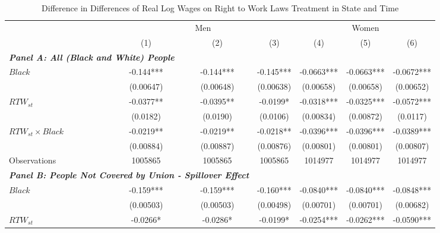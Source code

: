 \begin{table}[ht!]\centering
\def\sym#1{\ifmmode^{#1}\else\(^{#1}\)\fi}
\caption{Difference in Differences of Real Log Wages on Right to Work Laws Treatment in State and Time}
\fontsize{10}{11}\selectfont
\begin{tabular}{l*{6}{c}}
\hline
&\multicolumn{3}{c}{Men}                        &\multicolumn{3}{c}{Women}                      \\\cmidrule(lr){2-4}\cmidrule(lr){5-7}
&\multicolumn{1}{c}{(1)}   &\multicolumn{1}{c}{(2)}   &\multicolumn{1}{c}{(3)}   &\multicolumn{1}{c}{(4)}   &\multicolumn{1}{c}{(5)}   &\multicolumn{1}{c}{(6)}   \\
\hline
\multicolumn{3}{l}{\linebreak \textbf{\textit{Panel A: All (Black and White) People}}} \\
$ Black $           &      -0.144***&      -0.144***&      -0.145***&     -0.0663***&     -0.0663***&     -0.0672***\\
&   (0.00647)   &   (0.00648)   &   (0.00638)   &   (0.00658)   &   (0.00658)   &   (0.00652)   \\
[1em]
$ RTW_{st} $      &     -0.0377** &     -0.0395** &     -0.0199*  &     -0.0318***&     -0.0325***&     -0.0572***\\
&    (0.0182)   &    (0.0190)   &    (0.0106)   &   (0.00834)   &   (0.00872)   &    (0.0117)   \\
[1em]
$ RTW_{st} \times Black $&     -0.0219** &     -0.0219** &     -0.0218** &     -0.0396***&     -0.0396***&     -0.0389***\\
&   (0.00884)   &   (0.00887)   &   (0.00876)   &   (0.00801)   &   (0.00801)   &   (0.00807)   \\
\hline
Observations        &     1005865   &     1005865   &     1005865   &     1014977   &     1014977   &     1014977   \\
\hline
\multicolumn{3}{l}{\linebreak \textbf{\textit{Panel B: People Not Covered by Union - Spillover Effect}}} \\
$ Black $           &      -0.159***&      -0.159***&      -0.160***&     -0.0840***&     -0.0840***&     -0.0848***\\
&   (0.00503)   &   (0.00503)   &   (0.00498)   &   (0.00701)   &   (0.00701)   &   (0.00682)   \\
[1em]
$ RTW_{st} $      &     -0.0266*  &     -0.0286*  &     -0.0199*  &     -0.0254***&     -0.0262***&     -0.0590***\\

\end{tabular}
\end{table}
